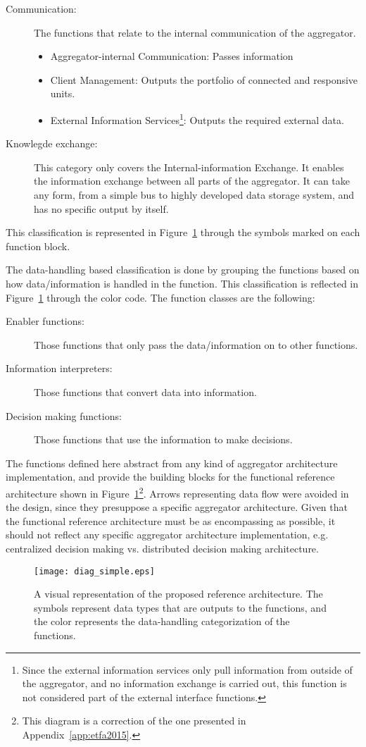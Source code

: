 \begin{description}
\begin{itemize}
		\end{itemize}
	\item[Communication:] The functions that relate to the internal communication of the aggregator.
		\begin{itemize}
			\item Aggregator-internal Communication: Passes information
			\item Client Management: Outputs the portfolio of connected and responsive units.
			\item External Information Services\footnote{Since the external information services only pull information from outside of the aggregator, and no information exchange is carried out, this function is not considered part of the external interface functions.}: Outputs the required external data.
		\end{itemize}
	\item[Knowlegde exchange:] This category only covers the Internal-information Exchange. It enables the information exchange between all parts of the aggregator. It can take any form, from a simple bus to highly developed data storage system, and has no specific output by itself.
\end{description}
This classification is represented in Figure~\ref{fig:MAINrefarch} through the symbols marked on each function block.

The data-handling based classification is done by grouping the functions based on how data/information is handled in the function. This classification is reflected in Figure~\ref{fig:MAINrefarch} through the color code. The function classes are the following:
\begin{description}
	\item[Enabler functions:] Those functions that only pass the data/information on to other functions.
	\item[Information interpreters:] Those functions that convert data into information.
	\item[Decision making functions:] Those functions that use the information to make decisions.
\end{description}

The functions defined here abstract from any kind of aggregator architecture implementation, and provide the building blocks for the functional reference architecture shown in Figure~\ref{fig:MAINrefarch}\footnote{This diagram is a correction of the one presented in Appendix~\ref{app:etfa2015}.}. Arrows representing data flow were avoided in the design, since they presuppose a specific aggregator architecture. Given that the functional reference architecture must be as encompassing as possible, it should not reflect any specific aggregator architecture implementation, e.g. centralized decision making vs. distributed decision making architecture. 
\begin{figure}[htb]
\centering
\texttt{[image: diag\_simple.eps]}
\caption{A visual representation of the proposed reference architecture. The symbols represent data types that are outputs to the functions, and the color represents the data-handling categorization of the functions.}
\label{fig:MAINrefarch}
\end{figure}

